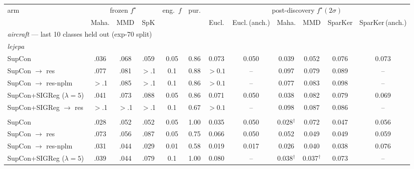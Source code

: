 \begin{table}[t]
\centering
\footnotesize
\begin{tabular}{lccccccccccc}
\toprule
arm & \multicolumn{3}{c}{frozen $f^\star$} & eng.\ $f$ & pur. & \multicolumn{6}{c}{post-discovery $f^\star(2\sigma)$} \\
\cmidrule(lr){2-4}\cmidrule(lr){7-12}
& Maha. & MMD & SpK & & & Eucl. & Eucl.\,(anch.) & Maha. & MMD & SparKer & SparKer\,(anch.) \\
\midrule
\multicolumn{12}{l}{\emph{aircraft} --- last 10 classes held out (exp-70 split)} \\
\multicolumn{12}{l}{\quad\emph{lejepa}} \\
SupCon & .036 & .068 & .059 & 0.05 & 0.86 & 0.073 & 0.050 & 0.039 & 0.052 & 0.076 & 0.073 \\
\quad SupCon $\to$ res & .077 & .081 & $>$.1 & 0.1 & 0.88 & $>0.1$ & -- & 0.097 & 0.079 & 0.089 & -- \\
\quad SupCon $\to$ res-nplm & $>$.1 & .085 & $>$.1 & 0.1 & 0.86 & $>0.1$ & -- & 0.077 & 0.083 & 0.098 & -- \\
SupCon+SIGReg ($\lambda{=}5$) & .041 & .073 & .088 & 0.05 & 0.86 & 0.071 & 0.050 & 0.038 & 0.082 & 0.079 & 0.069 \\
\quad SupCon+SIGReg $\to$ res & $>$.1 & $>$.1 & $>$.1 & 0.1 & 0.67 & $>0.1$ & -- & 0.098 & 0.087 & 0.086 & -- \\
\addlinespace
\multicolumn{12}{l}{\quad\emph{visreg}} \\
SupCon & .028 & .052 & .052 & 0.05 & 1.00 & 0.035 & 0.050 & 0.028$^\dagger$ & 0.072 & 0.047 & 0.056 \\
\quad SupCon $\to$ res & .073 & .056 & .087 & 0.05 & 0.75 & 0.066 & 0.050 & 0.052 & 0.049 & 0.049 & 0.059 \\
\quad SupCon $\to$ res-nplm & .031 & .044 & .029 & 0.01 & 0.58 & 0.019 & 0.017 & 0.026 & 0.040 & 0.038 & 0.076 \\
SupCon+SIGReg ($\lambda{=}5$) & .039 & .044 & .079 & 0.1 & 1.00 & 0.080 & -- & 0.038$^\dagger$ & 0.037$^\dagger$ & 0.073 & -- \\

\end{tabular}
\end{table}
